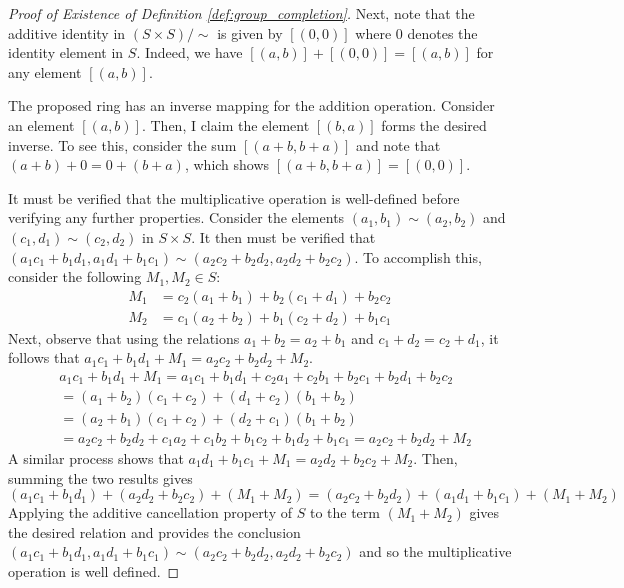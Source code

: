 \documentclass[../../sean_thesis.tex]{subfiles}
\begin{document}
\begin{proof}[Proof of Existence of Definition \ref{def:group_completion}]
	
Next, note that the additive identity in $(S\times S)/\sim$ is given by $[(0,0)]$ where $0$ denotes the identity element in $S$. Indeed, we have $[(a,b)] + [(0,0)] = [(a,b)]$ for any element $[(a,b)]$.
	
	
The proposed ring has an inverse mapping for the addition operation. Consider an element $[(a,b)]$. Then, I claim the element $[(b,a)]$ forms the desired inverse. To see this, consider the sum $[(a + b, b + a)]$ and note that $(a + b) + 0 = 0 + (b + a)$, which shows $[(a + b, b + a)] = [(0,0)]$.


It must be verified that the multiplicative operation is well-defined before verifying any further properties. Consider the elements $(a_1,b_1) \sim (a_2,b_2)$ and $(c_1,d_1) \sim (c_2,d_2)$ in $S \times S$. It then must be verified that $(a_1c_1+b_1d_1, a_1d_1+b_1c_1)\sim(a_2c_2+b_2d_2, a_2d_2+b_2c_2)$. To accomplish this, consider the following $M_1, M_2 \in S$:
\begin{align*}
	M_1 &= c_2(a_1+b_1) + b_2(c_1+d_1) + b_2c_2\\
	M_2 &= c_1(a_2+b_2) + b_1(c_2+d_2) + b_1c_1
\end{align*}
Next, observe that using the relations $a_1+b_2=a_2+b_1$ and $c_1+d_2=c_2+d_1$, it follows that $a_1c_1+b_1d_1 + M_1 = a_2c_2+b_2d_2 + M_2$.
\begin{align*}
	&a_1c_1+b_1d_1 + M_1
	= a_1c_1+b_1d_1 + c_2a_1+c_2b_1+b_2c_1+b_2d_1+b_2c_2\\
	&= (a_1+b_2)(c_1+c_2) + (d_1+c_2)(b_1+b_2)\\
	&= (a_2+b_1)(c_1+c_2) + (d_2+c_1)(b_1+b_2)\\
	&= a_2c_2+b_2d_2 + c_1a_2+c_1b_2+b_1c_2+b_1d_2+b_1c_1
	= a_2c_2+b_2d_2 + M_2
\end{align*}
A similar process shows that $a_1d_1+b_1c_1 + M_1 = a_2d_2+b_2c_2 + M_2$. Then, summing the two results gives
\begin{equation*}
 (a_1c_1+b_1d_1) + (a_2d_2+b_2c_2) + (M_1 + M_2)
=(a_2c_2+b_2d_2) + (a_1d_1+b_1c_1) + (M_1 + M_2)
\end{equation*}
Applying the additive cancellation property of $S$ to the term $(M_1+M_2)$ gives the desired relation and provides the conclusion $(a_1c_1+b_1d_1, a_1d_1+b_1c_1)\sim(a_2c_2+b_2d_2, a_2d_2+b_2c_2)$ and so the multiplicative operation is well defined.


\end{proof}
\end{document}
